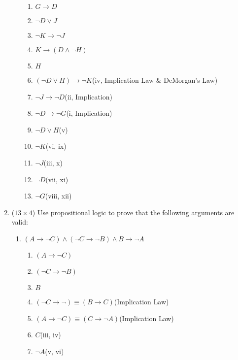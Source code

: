 \documentclass[12pt]{article}
\begin{document}
\begin{enumerate}
\begin{enumerate}
\begin{enumerate}
	\item $G \to D$
	\item $\lnot D \lor J$
	\item $\lnot K \to \lnot J$
	\item $K \to (D \land \lnot H)$
	\item $H$
	\item $(\lnot D \lor H) \to \lnot K$\hfill(iv, Implication Law \& DeMorgan's Law)
	\item $\lnot J \to \lnot D$\hfill(ii, Implication)
	\item $\lnot D \to \lnot G$\hfill(i, Implication)
	\item $\lnot D \lor H$\hfill(v)
	\item $\lnot K$\hfill(vi, ix)
	\item $\lnot J$\hfill(iii, x)
	\item $\lnot D$\hfill(vii, xi)
	\item $\lnot G$\hfill(viii, xii)
\end{enumerate}
\end{enumerate}

\clearpage

\item ($13 \times 4$)
Use propositional logic to prove that the following arguments are valid:

\begin{enumerate}

\item
$(A \to \lnot C) \land (\lnot C \to \lnot B) \land B \to \lnot A$
\begin{enumerate}
	\item $(A \to \lnot C)$
	\item $(\lnot C \to \lnot B)$
	\item $B$
	\item $(\lnot C \to \lnot) \equiv (B \to C)$\hfill(Implication Law)
	\item $(A \to \lnot C) \equiv (C \to \lnot A)$\hfill(Implication Law)
	\item $C$\hfill(iii, iv)
	\item $\lnot A$\hfill(v, vi)
\end{enumerate}



\end{enumerate}
\end{enumerate}
\end{document}
